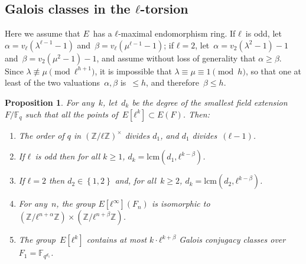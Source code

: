 \documentclass{lms}
\newtheorem{prop}[thm]{Proposition}
\def\acco#1{\left\{#1\right\}}
\newcommand{\F}{\mathbb{F}}
\begin{document}
\subsection{Galois classes in the $ℓ$-torsion}
Here we assume that $E$~has a $ℓ$-maximal endomorphism ring.
If $ℓ$~is odd, let~$α = v_ℓ(λ^{ℓ-1}-1)$ and~$β=v_ℓ(μ^{ℓ-1}-1)$;
if $ℓ=2$, let~$α=v_2(λ^2-1)-1$ and~$β = v_2(μ^2-1)-1$,
and assume without loss of generality that $α ≥ β$.
Since $λ ≢ μ \pmod{ℓ^{h+1}}$, it is impossible that $λ ≡ μ ≡ 1 \pmod{h}$,
so that one at least of the two valuations~$α, β$ is~$≤ h$,
and therefore~$β ≤ h$.
\label{sub:classes}
\begin{prop}\label{prop:classes}
For any~$k$, let~$d_k$ be the degree of the smallest field extension $F/\F_q$
such that all the points of~$E[ℓ^k]⊂E(F)$. Then:
\begin{enumerate}
\item The order of $q$ in $(ℤ/ℓℤ)^×$ divides $d_1$,
and $d_1$ divides~$(ℓ-1)$.
\item If $ℓ$~is odd then for all $k ≥ 1$,
$d_k = \mathrm {lcm} (d_1, ℓ^{k-β})$.
\item If $ℓ=2$ then $d_2 ∈ \acco{1,2}$ and, for all~$k ≥ 2$,
$d_k = \mathrm{lcm}(d_2, ℓ^{k-β})$.
\item For any~$n$, the group $E[ℓ^{∞}](F_n)$
is isomorphic to~$(ℤ/ℓ^{n+α} ℤ) × (ℤ/ℓ^{n+β} ℤ)$.
\item\label{prop:classes:count} The group~$E[ℓ^k]$ contains at most
$k · ℓ^{k+β}$ Galois conjugacy classes over~$F_1 = \F_{q^{d_1}}$.
\end{enumerate}
\end{prop}
\end{document}
